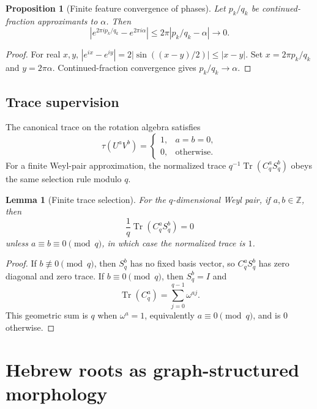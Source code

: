 \documentclass[11pt]{article}
\theoremstyle{definition}
\theoremstyle{plain}
\newtheorem{lemma}[definition]{Lemma}
\newtheorem{proposition}[definition]{Proposition}
\theoremstyle{remark}
\numberwithin{equation}{section}
\newcommand{\Z}{\mathbb{Z}}
\newcommand{\Tr}{\operatorname{Tr}}
\newcommand{\abs}[1]{\left\lvert #1\right\rvert}
\begin{document}
\begin{proposition}[Finite feature convergence of phases]
Let $p_k/q_k$ be continued-fraction approximants to $\alpha$.  Then
\begin{equation}
  \abs{e^{2\pi i p_k/q_k}-e^{2\pi i\alpha}}\le 2\pi\abs{p_k/q_k-\alpha}\to0.
\end{equation}
\end{proposition}

\begin{proof}
For real $x,y$, $\abs{e^{ix}-e^{iy}}=2\abs{\sin((x-y)/2)}\le\abs{x-y}$.  Set $x=2\pi p_k/q_k$ and $y=2\pi\alpha$.  Continued-fraction convergence gives $p_k/q_k\to\alpha$.
\end{proof}

\subsection{Trace supervision}

The canonical trace on the rotation algebra satisfies
\begin{equation}
  \tau(U^aV^b)=\begin{cases}1,&a=b=0,\\0,&\text{otherwise.}\end{cases}
\end{equation}
For a finite Weyl-pair approximation, the normalized trace $q^{-1}\Tr(C_q^aS_q^b)$ obeys the same selection rule modulo $q$.

\begin{lemma}[Finite trace selection]
For the $q$-dimensional Weyl pair, if $a,b\in\Z$, then
\begin{equation}
  \frac1q\Tr(C_q^aS_q^b)=0
\end{equation}
unless $a\equiv b\equiv0\pmod q$, in which case the normalized trace is $1$.
\end{lemma}

\begin{proof}
If $b\not\equiv0\pmod q$, then $S_q^b$ has no fixed basis vector, so $C_q^aS_q^b$ has zero diagonal and zero trace.  If $b\equiv0\pmod q$, then $S_q^b=I$ and
\begin{equation}
  \Tr(C_q^a)=\sum_{j=0}^{q-1}\omega^{aj}.
\end{equation}
This geometric sum is $q$ when $\omega^a=1$, equivalently $a\equiv0\pmod q$, and is $0$ otherwise.
\end{proof}

\section{Hebrew roots as graph-structured morphology}
\end{document}
